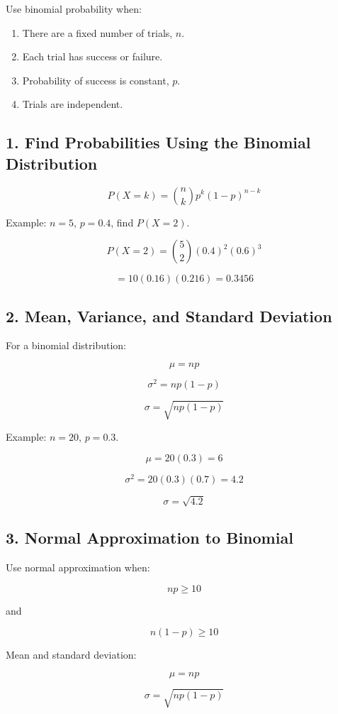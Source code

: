 \documentclass[11pt]{article}
\begin{document}
Use binomial probability when:

\begin{enumerate}
  \item There are a fixed number of trials, \(n\).
  \item Each trial has success or failure.
  \item Probability of success is constant, \(p\).
  \item Trials are independent.
\end{enumerate}

\subsection*{1. Find Probabilities Using the Binomial Distribution}

\[
P(X=k)=
{n\choose k}p^k(1-p)^{n-k}
\]

Example: \(n=5\), \(p=0.4\), find \(P(X=2)\).

\[
P(X=2)=
{5\choose2}(0.4)^2(0.6)^3
\]

\[
=10(0.16)(0.216)=0.3456
\]

\subsection*{2. Mean, Variance, and Standard Deviation}

For a binomial distribution:

\[
\mu=np
\]

\[
\sigma^2=np(1-p)
\]

\[
\sigma=\sqrt{np(1-p)}
\]

Example: \(n=20\), \(p=0.3\).

\[
\mu=20(0.3)=6
\]

\[
\sigma^2=20(0.3)(0.7)=4.2
\]

\[
\sigma=\sqrt{4.2}
\]

\subsection*{3. Normal Approximation to Binomial}

Use normal approximation when:

\[
np\ge 10
\]

and

\[
n(1-p)\ge 10
\]

Mean and standard deviation:

\[
\mu=np
\]

\[
\sigma=\sqrt{np(1-p)}
\]
\end{document}
